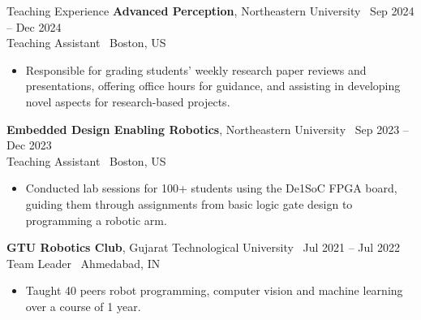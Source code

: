 \documentclass{resume}
\begin{document}
\begin{rSection}{Teaching Experience}
% 
{\bf Advanced Perception}{, Northeastern University} \hfill {\ Sep 2024 -- Dec 2024}\\
Teaching Assistant \hfill {\ {Boston, US}}
\begin{itemize}
  \item \vspace{-0.5em} Responsible for grading students’ weekly research paper reviews and presentations, offering office hours for guidance, and assisting in developing novel aspects for research-based projects.
 \vspace{-0.3em}
\end{itemize} 
{\bf Embedded Design Enabling Robotics}{, Northeastern University} \hfill {\ Sep 2023 -- Dec 2023}\\
Teaching Assistant \hfill {\ {Boston, US}}
\begin{itemize}
  \item \vspace{-0.5em} Conducted lab sessions for 100+ students using the De1SoC FPGA board, guiding them through assignments from basic logic gate design to programming a robotic arm.
 \vspace{-0.3em}
\end{itemize} 

{\bf GTU Robotics Club}{, Gujarat Technological University} \hfill {\ Jul 2021 -- Jul 2022}\\
Team Leader \hfill {\ {Ahmedabad, IN}}
\begin{itemize}
  \item \vspace{-0.5em} Taught 40 peers robot programming, computer vision and machine learning over a course of 1 year. \vspace{-0.3em}
\end{itemize} 

\end{rSection}

\end{document}
